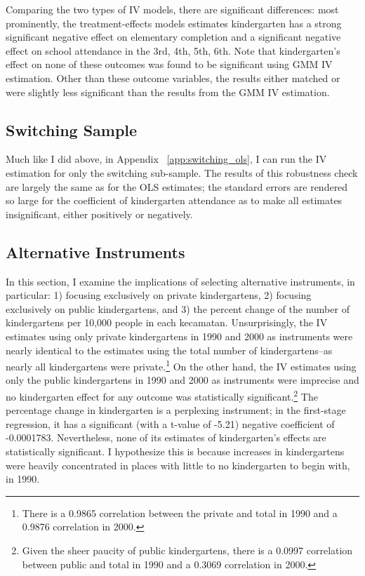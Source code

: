 Comparing the two types of IV models, there are significant differences: most prominently, the treatment-effects models estimates kindergarten has a strong significant negative effect on elementary completion and a significant negative effect on school attendance in the 3rd, 4th, 5th, 6th. Note that kindergarten's effect on none of these outcomes was found to be significant using GMM IV estimation. Other than these outcome variables, the results either matched or were slightly less significant than the results from the GMM IV estimation.

	\subsection{Switching Sample}
Much like I did above, in Appendix ~\ref{app:switching_ols}, I can run the IV estimation for only the switching sub-sample. The results of this robustness check are largely the same as for the OLS estimates; the standard errors are rendered so large for the coefficient of kindergarten attendance as to make all estimates insignificant, either positively or negatively.

	\subsection{Alternative Instruments}
In this section, I examine the implications of selecting alternative instruments, in particular: 1) focusing exclusively on private kindergartens, 2) focusing exclusively on public kindergartens, and 3) the percent change of the number of kindergartens per 10,000 people in each kecamatan. Unsurprisingly, the IV estimates using only private kindergartens in 1990 and 2000 as instruments were nearly identical to the estimates using the total number of kindergartens--as nearly all kindergartens were private.\footnote{There is a 0.9865 correlation between the private and total in 1990 and a 0.9876 correlation in 2000.} On the other hand, the IV estimates using only the public kindergartens in 1990 and 2000 as instruments were imprecise and no kindergarten effect for any outcome was statistically significant.\footnote{Given the sheer paucity of public kindergartens, there is a 0.0997 correlation between public and total in 1990 and a 0.3069 correlation in 2000.} The percentage change in kindergarten is a perplexing instrument; in the first-stage regression, it has a significant (with a t-value of -5.21) negative coefficient of -0.0001783. Nevertheless, none of its estimates of kindergarten's effects are statistically significant. I hypothesize this is because increases in kindergartens were heavily concentrated in places with little to no kindergarten to begin with, in 1990. 

